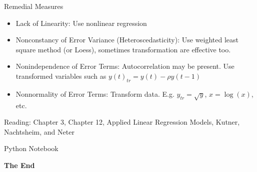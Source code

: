 \documentclass[aspectratio=169,xcolor=dvipsnames,svgnames,x11names,fleqn]{beamer}
\begin{document}
\begin{frame}{Remedial Measures}

    \begin{itemize}
        \item Lack of Linearity: Use nonlinear regression
        \item Nonconstancy of Error Variance (Heteroscedasticity): Use weighted least square method (or Loess), sometimes transformation are effective too.
        \item Nonindependence of Error Terms: Autocorrelation may be present. Use transformed variables such as $y(t)_{tr} = y(t) - \rho y(t-1)$
        \item Nonnormality of Error Terms: Transform data. E.g. $y_{tr} = \sqrt{y}$, $x = \log(x)$, etc.
    \end{itemize}

     Reading: Chapter 3, Chapter 12, Applied Linear Regression Models, Kutner, Nachtsheim, and Neter
    
    
\end{frame}









    
    
    \begin{frame}[containsverbatim]{Python Notebook}
    \begin{center}
    \small
    { }
    \end{center}
    \end{frame}
    
    
    \begin{frame}
        \Huge{\centerline{\color{MediumBlue}\textbf{The End}}}
    \end{frame}
\end{document}
